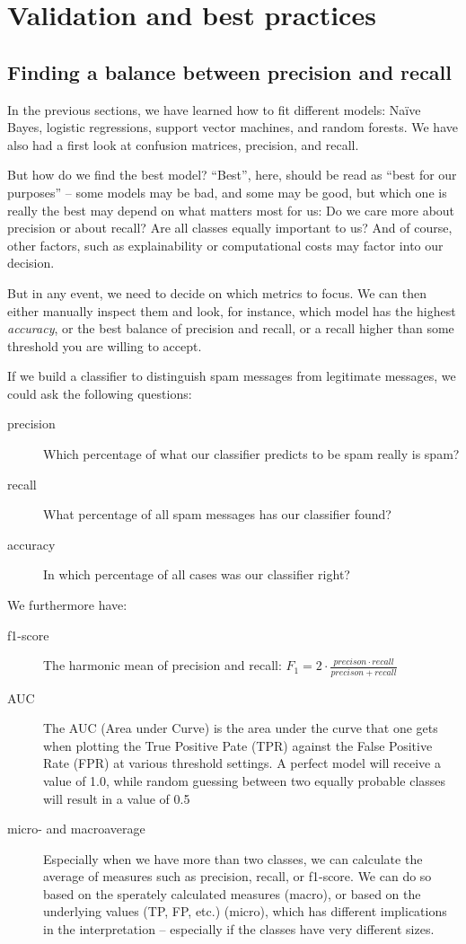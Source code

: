 \section{Validation and best practices}
\label{sec:validation}
\subsection{Finding a balance between precision and recall}
In the previous sections, we have learned how to fit different models:
Na\"ive Bayes, logistic regressions, support vector machines, and
random forests.  We have also had a first look at confusion matrices,
precision, and recall.

But how do we find the best model? ``Best'', here, should be read as
``best for our purposes'' -- some models may be bad, and some may be
good, but which one is really the best may depend on what matters most
for us: Do we care more about precision or about recall? Are all
classes equally important to us?  And of course, other factors, such
as explainability or computational costs may factor into our decision.
 
But in any event, we need to decide on which metrics to focus.  We can
then either manually inspect them and look, for instance, which model
has the highest \emph{accuracy}, or the best balance of precision and recall,
or a recall higher than some threshold you are willing to accept.

If we build a classifier to distinguish spam messages from legitimate
messages, we could ask the following questions:
\begin{description}
\item[precision] Which percentage of what our classifier predicts to be
  spam really is spam?
\item[recall]{What percentage of all spam messages has our classifier
  found?}
\item[accuracy]{In which percentage of all cases was our classifier
  right?}
\end{description}

We furthermore have:
\begin{description}
\item[f1-score]{The harmonic mean of precision and recall: $F_1 = 2
  \cdot \frac{precison \cdot recall}{precison + recall}$}
\item[AUC]{The AUC (Area under Curve) is the area under the curve that
  one gets when plotting the True Positive Pate (TPR) against the
  False Positive Rate (FPR) at various threshold settings. A perfect
  model will receive a value of 1.0, while random guessing between two
  equally probable classes will result in a value of 0.5}
\item[micro- and macroaverage]{Especially when we have more than two
  classes, we can calculate the average of measures such as precision,
  recall, or f1-score. We can do so based on the sperately calculated
  measures (macro), or based on the underlying values (TP, FP, etc.)
  (micro), which has different implications in the interpretation --
  especially if the classes have very different sizes.}
\end{description}


